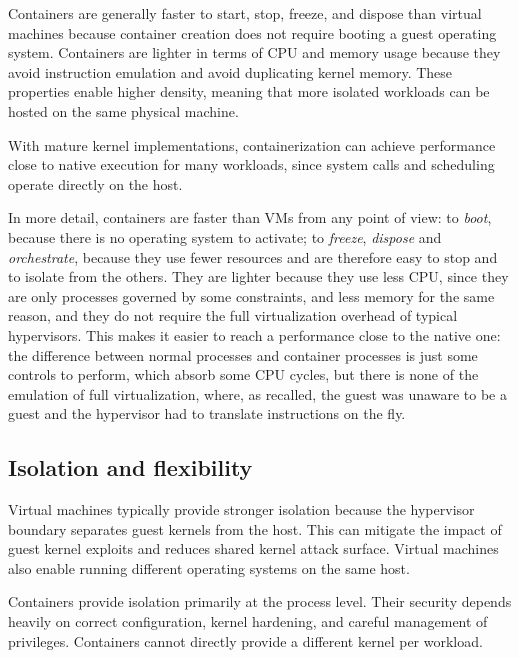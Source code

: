 Containers are generally faster to start, stop, freeze, and dispose than virtual machines because container creation does not require booting a guest operating system. Containers are lighter in terms of CPU and memory usage because they avoid instruction emulation and avoid duplicating kernel memory. These properties enable higher density, meaning that more isolated workloads can be hosted on the same physical machine.

With mature kernel implementations, containerization can achieve performance close to native execution for many workloads, since system calls and scheduling operate directly on the host.

In more detail, containers are faster than VMs from any point of view: to \emph{boot}, because there is no operating system to activate; to \emph{freeze}, \emph{dispose} and \emph{orchestrate}, because they use fewer resources and are therefore easy to stop and to isolate from the others. They are lighter because they use less CPU, since they are only processes governed by some constraints, and less memory for the same reason, and they do not require the full virtualization overhead of typical hypervisors. This makes it easier to reach a performance close to the native one: the difference between normal processes and container processes is just some controls to perform, which absorb some CPU cycles, but there is none of the emulation of full virtualization, where, as recalled, the guest was unaware to be a guest and the hypervisor had to translate instructions on the fly.

\subsection{Isolation and flexibility}

Virtual machines typically provide stronger isolation because the hypervisor boundary separates guest kernels from the host. This can mitigate the impact of guest kernel exploits and reduces shared kernel attack surface. Virtual machines also enable running different operating systems on the same host.

Containers provide isolation primarily at the process level. Their security depends heavily on correct configuration, kernel hardening, and careful management of privileges. Containers cannot directly provide a different kernel per workload.

